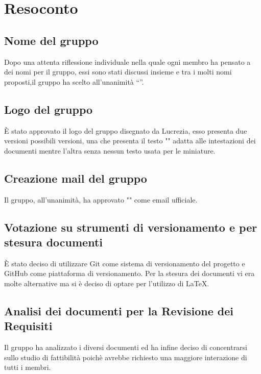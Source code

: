 \newpage

\section{Resoconto}

\subsection{Nome del gruppo}

Dopo una attenta riflessione individuale nella quale ogni membro ha pensato a dei nomi per il gruppo, essi sono stati discussi insieme e tra i molti nomi proposti,il gruppo ha scelto all’unanimità “\textit{\Gruppo{}}”.

\subsection{Logo del gruppo}

È stato approvato il logo del gruppo disegnato da Lucrezia, esso presenta due versioni possibili versioni, una che presenta il testo "\Gruppo{}" adatta alle intestazioni dei documenti mentre l'altra senza nessun testo usata per le miniature.

\subsection{Creazione mail del gruppo}

Il gruppo, all'unanimità, ha approvato "\textit{\Mail{}}" come email ufficiale.

\subsection{Votazione su strumenti di versionamento e per stesura documenti}

È stato deciso di utilizzare Git come sistema di versionamento del progetto e GitHub come piattaforma di versionamento. Per la stesura dei documenti vi era molte alternative ma si è deciso di optare per l'utilizzo di \LaTeX.


\subsection{Analisi dei documenti per la Revisione dei Requisiti}

Il gruppo ha analizzato i diversi documenti ed ha infine deciso di concentrarsi sullo studio di fattibilità poichè avrebbe richiesto una maggiore interazione di tutti i membri.

